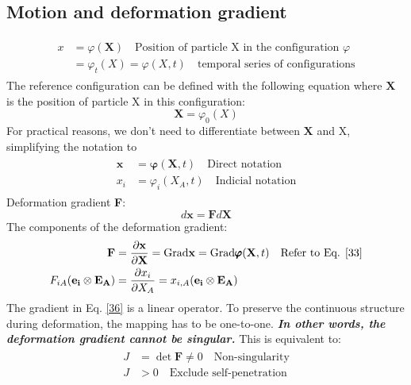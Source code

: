 \documentclass[12pt,3p]{article}
\numberwithin{equation}{section}
\begin{document}
\subsection{Motion and deformation gradient}
\begin{align}\label{31}
\begin{split}
x &= \varphi (\mathbf{X}) \quad \text{Position of particle X in the configuration } \varphi \\
  &= \varphi_t (X) = \varphi (X, t) \quad \text{temporal series of configurations}
\end{split}
\end{align}
The reference configuration can be defined with the following equation where $\mathbf{X}$ is the position of particle X in this configuration:
\begin{equation*}
\mathbf{X} = \varphi_0 (X)
\end{equation*}
For practical reasons, we don't need to differentiate between $\mathbf{X}$ and X, simplifying the notation to 
\begin{align}\label{33}
\begin{split}
\mathbf{x} &= \pmb{\varphi} (\mathbf{X}, t) \quad \text{Direct notation} \\
x_i &= \varphi_i (X_A, t)\quad \text{Indicial notation}
\end{split}
\end{align}
Deformation gradient \textbf{F}:
\begin{equation}\label{35}
d\mathbf{x} = \mathbf{F} d\mathbf{X}
\end{equation}
The components of the deformation gradient:
\begin{align}\label{36}
\begin{split}
\mathbf{F} &= \pdv{\mathbf{x}}{\mathbf{X}} = \text{Grad} \mathbf{x} = \text{Grad} \pmb{\varphi} (\mathbf{X}, t) \quad \text{Refer to Eq. } \ref{33}\\
F_{iA} (\mathbf{e_i} \otimes \mathbf{E_A}) &= \pdv{x_i}{X_A} (\mathbf{e_i} \otimes \mathbf{E_A}) = x_{i,A} (\mathbf{e_i} \otimes \mathbf{E_A})
\end{split}
\end{align}
The gradient in Eq. \ref{36} is a linear operator. To preserve the continuous structure during deformation, the mapping has to be one-to-one. \textbf{\textit{In other words, the deformation gradient cannot be singular.}} This is equivalent to: 
\begin{align}\label{37}
\begin{split}
J &= \det \mathbf{F} \neq 0 \quad \text{Non-singularity} \\
J &> 0 \quad \text{Exclude self-penetration} \\
\end{split}
\end{align}
\end{document}
